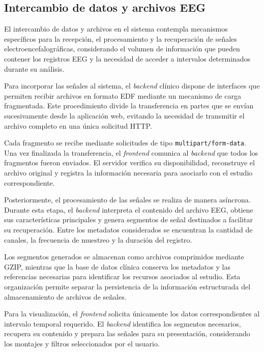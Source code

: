 \subsection{Intercambio de datos y archivos EEG}
\label{subsec:intercambio-datos-archivos-eeg}

El intercambio de datos y archivos en el sistema
contempla mecanismos específicos para la recepción,
el procesamiento y la recuperación de señales
electroencefalográficas, considerando el volumen
de información que pueden contener los registros
EEG y la necesidad de acceder a intervalos
determinados durante su análisis.

Para incorporar las señales al sistema, el \textit{backend}
clínico dispone de interfaces que permiten
recibir archivos en formato EDF mediante
un mecanismo de carga fragmentada. Este
procedimiento divide la transferencia en partes
que se envían sucesivamente desde la aplicación
web, evitando la necesidad de transmitir el
archivo completo en una única solicitud HTTP.

Cada fragmento se recibe mediante solicitudes
de tipo \texttt{multipart/form-data}. Una vez
finalizada la transferencia, el \textit{frontend} comunica
al \textit{backend} que todos los fragmentos fueron
enviados. El servidor verifica su disponibilidad,
reconstruye el archivo original y registra
la información necesaria para asociarlo con
el estudio correspondiente.

Posteriormente, el procesamiento de las señales
se realiza de manera asíncrona. Durante esta
etapa, el \textit{backend} interpreta el contenido del
archivo EEG, obtiene sus características
principales y genera segmentos de señal
destinados a facilitar su recuperación.
Entre los metadatos considerados se encuentran
la cantidad de canales, la frecuencia de
muestreo y la duración del registro.

Los segmentos generados se almacenan como
archivos comprimidos mediante GZIP, mientras
que la base de datos clínica conserva los
metadatos y las referencias necesarias para
identificar los recursos asociados al estudio.
Esta organización permite separar la
persistencia de la información estructurada
del almacenamiento de archivos de señales.

Para la visualización, el \textit{frontend} solicita
únicamente los datos correspondientes al
intervalo temporal requerido. El \textit{backend}
identifica los segmentos necesarios, recupera
su contenido y prepara las señales para
su presentación, considerando los montajes
y filtros seleccionados por el usuario.

